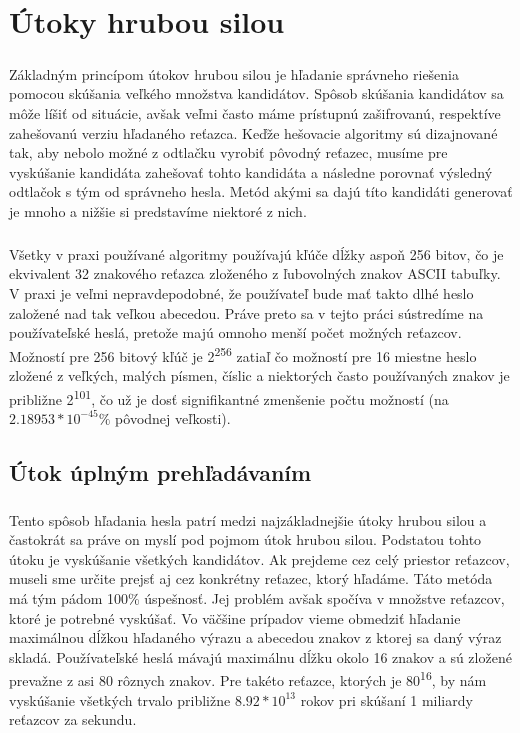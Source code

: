 \chapter{Útoky hrubou silou}
\paragraph{}
Základným princípom útokov hrubou silou je hľadanie správneho riešenia pomocou skúšania veľkého množstva kandidátov. Spôsob skúšania kandidátov sa môže líšiť od situácie, avšak veľmi často máme prístupnú zašifrovanú, respektíve zahešovanú verziu hľadaného reťazca. Keďže hešovacie algoritmy sú dizajnované tak, aby nebolo možné z odtlačku vyrobiť pôvodný reťazec, musíme pre vyskúšanie kandidáta zahešovať tohto kandidáta a následne porovnať výsledný odtlačok s tým od správneho hesla. Metód akými sa dajú títo kandidáti generovať je mnoho a nižšie si predstavíme niektoré z nich.

\paragraph{}
Všetky v praxi používané algoritmy používajú kľúče dĺžky aspoň 256 bitov, čo je ekvivalent 32 znakového reťazca zloženého z ľubovolných znakov ASCII tabuľky. V praxi je veľmi nepravdepodobné, že používateľ bude mať takto dlhé heslo založené nad tak veľkou abecedou. Práve preto sa v tejto práci sústredíme na používateľské heslá, pretože majú omnoho menší počet možných reťazcov. Možností pre 256 bitový kľúč je 2\textsuperscript{256} zatiaľ čo možností pre 16 miestne heslo zložené z veľkých, malých písmen, číslic a niektorých často používaných znakov je približne 2\textsuperscript{101}, čo už je dosť signifikantné zmenšenie počtu možností (na \(2.18953*10^{-45} \%\) pôvodnej veľkosti).

\section{Útok úplným prehľadávaním}
\paragraph{}
Tento spôsob hľadania hesla patrí medzi najzákladnejšie útoky hrubou silou a častokrát sa práve on myslí pod pojmom útok hrubou silou. Podstatou tohto útoku je vyskúšanie všetkých kandidátov. Ak prejdeme cez celý priestor reťazcov, museli sme určite prejsť aj cez konkrétny reťazec, ktorý hľadáme. Táto metóda má tým pádom 100\% úspešnosť. Jej problém avšak spočíva v množstve reťazcov, ktoré je potrebné vyskúšať. Vo väčšine prípadov vieme obmedziť hľadanie maximálnou dĺžkou hľadaného výrazu a abecedou znakov z ktorej sa daný výraz skladá. Používateľské heslá mávajú maximálnu dĺžku okolo 16 znakov a sú zložené prevažne z asi 80 rôznych znakov. Pre takéto reťazce, ktorých je 80\textsuperscript{16}, by nám vyskúšanie všetkých trvalo približne \(8.92*10^{13}\) rokov pri skúšaní 1 miliardy reťazcov za sekundu.


